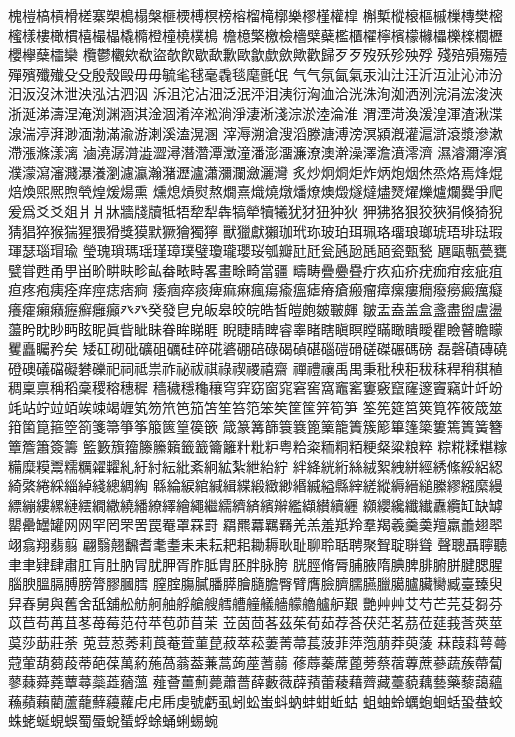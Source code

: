 槐榿槁槓榾槎寨槊槝榻槃榧樮榑榠榜榕榴槞槨樂樛槿權槹
槲槧樅榱樞槭樔槫樊樒櫁樣樓橄樌橲樶橸橇橢橙橦橈樸樢
檐檍檠檄檢檣檗蘗檻櫃櫂檸檳檬櫞櫑櫟檪櫚櫪櫻欅蘖櫺欒
欖鬱欟欸欷盜欹飮歇歃歉歐歙歔歛歟歡歸⽍歹歿殀殄殃殍
殘殕殞殤殪殫殯殲殱⽎殳殷殼毆⽏毋毓毟毬毫毳毯麾氈氓
⽓气氛氤氣汞汕汢汪沂沍沚沁沛汾汨汳沒沐泄泱泓沽泗泅
泝沮沱沾沺泛泯泙泪洟衍洶洫洽洸洙洵洳洒洌浣涓浤浚浹
浙涎涕濤涅淹渕渊涵淇淦涸淆淬淞淌淨淒淅淺淙淤淕淪淮
渭湮渮渙湲湟渾渣湫渫湶湍渟湃渺湎渤滿渝游溂溪溘滉溷
滓溽溯滄溲滔滕溏溥滂溟潁漑灌滬滸滾漿滲漱滯漲滌漾漓
滷澆潺潸澁澀潯潛濳潭澂潼潘澎澑濂潦澳澣澡澤澹濆澪濟
濕濬濔濘濱濮濛瀉瀋濺瀑瀁瀏濾瀛瀚潴瀝瀘瀟瀰瀾瀲灑灣
炙炒炯烱炬炸炳炮烟烋烝烙焉烽焜焙煥煕熈煦煢煌煖煬熏
燻熄熕熨熬燗熹熾燒燉燔燎燠燬燧燵燼燹燿爍爐爛爨爭爬
爰爲⽘爻爼⽙爿牀牆牋牘牴牾犂犁犇犒犖犢犧犹犲狃狆狄
狎狒狢狠狡狹狷倏猗猊猜猖猝猴猯猩猥猾獎獏默獗獪獨獰
獸獵獻獺珈玳珎玻珀珥珮珞璢琅瑯琥珸琲琺瑕琿瑟瑙瑁瑜
瑩瑰瑣瑪瑶瑾璋璞璧瓊瓏瓔珱瓠瓣瓧瓩瓮瓲瓰瓱瓸瓷甄甃
甅甌甎甍甕甓甞甦甬甼畄畍畊畉畛畆畚畩畤畧畫畭畸當疆
疇畴疊疉疂疔疚疝疥疣痂疳痃疵疽疸疼疱痍痊痒痙痣痞痾
痿痼瘁痰痺痲痳瘋瘍瘉瘟瘧瘠瘡瘢瘤瘴瘰瘻癇癈癆癜癘癡
癢癨癩癪癧癬癰癲⽨癶癸發皀皃皈皋皎皖皓皙皚皰皴皸皹
皺盂盍盖盒盞盡盥盧盪蘯盻眈眇眄眩眤眞眥眦眛眷眸睇睚
睨睫睛睥睿睾睹瞎瞋瞑瞠瞞瞰瞶瞹瞿瞼瞽瞻矇矍矗矚矜矣
矮矼砌砒礦砠礪硅碎硴碆硼碚碌碣碵碪碯磑磆磋磔碾碼磅
磊磬磧磚磽磴礇礒礑礙礬礫祀祠祗祟祚祕祓祺祿禊禝禧齋
禪禮禳禹禺秉秕秧秬秡秣稈稍稘稙稠稟禀稱稻稾稷穃穗穉
穡穢穩龝穰穹穽窈窗窕窘窖窩竈窰窶竅竄窿邃竇竊竍竏竕
竓站竚竝竡竢竦竭竰笂笏笊笆笳笘笙笞笵笨笶筐筺笄筍笋
筌筅筵筥筴筧筰筱筬筮箝箘箟箍箜箚箋箒箏筝箙篋篁篌篏
箴篆篝篩簑簔篦篥籠簀簇簓篳篷簗簍篶簣簧簪簟簷簫簽籌
籃籔籏籀籐籘籟籤籖籥籬籵粃粐粤粭粢粫粡粨粳粲粱粮粹
粽糀糅糂糘糒糜糢鬻糯糲糴糶糺紆紂紜紕紊絅絋紮紲紿紵
絆絳絖絎絲絨絮絏絣經綉絛綏絽綛綺綮綣綵緇綽綫總綢綯
緜綸綟綰緘緝緤緞緻緲緡縅縊縣縡縒縱縟縉縋縢繆繦縻縵
縹繃縷縲縺繧繝繖繞繙繚繹繪繩繼繻纃緕繽辮繿纈纉續纒
纐纓纔纖纎纛纜缸缺罅罌罍罎罐⽹网罕罔罘罟罠罨罩罧罸
羂羆羃羈羇羌羔羞羝羚羣羯羲羹羮羶羸譱翅翆翊翕翔翡翦
翩翳翹飜耆耄耋⽾耒耘耙耜耡耨耿耻聊聆聒聘聚聟聢聨聳
聲聰聶聹聽⾀聿肄肆肅肛肓肚肭冐肬胛胥胙胝胄胚胖脉胯
胱脛脩脣脯腋隋腆脾腓腑胼腱腮腥腦腴膃膈膊膀膂膠膕膤
膣腟膓膩膰膵膾膸膽臀臂膺臉臍臑臙臘臈臚臟臠臧臺臻臾
舁舂舅與舊舍舐舖舩舫舸舳艀艙艘艝艚艟艤艢艨艪艫舮艱
艷⾋艸艾芍芒芫芟芻芬苡苣苟苒苴苳苺莓范苻苹苞茆苜茉
苙茵茴茖茲茱荀茹荐荅茯茫茗茘莅莚莪莟莢莖茣莎莇莊荼
莵荳荵莠莉莨菴萓菫菎菽萃菘萋菁菷萇菠菲萍萢萠莽萸蔆
菻葭萪萼蕚蒄葷葫蒭葮蒂葩葆萬葯葹萵蓊葢蒹蒿蒟蓙蓍蒻
蓚蓐蓁蓆蓖蒡蔡蓿蓴蔗蔘蔬蔟蔕蔔蓼蕀蕣蕘蕈蕁蘂蕋蕕薀
薤薈薑薊薨蕭薔薛藪薇薜蕷蕾薐藉薺藏薹藐藕藝藥藜藹蘊
蘓蘋藾藺蘆蘢蘚蘰蘿⾌虍乕虔號虧虱蚓蚣蚩蚪蚋蚌蚶蚯蛄
蛆蚰蛉蠣蚫蛔蛞蛩蛬蛟蛛蛯蜒蜆蜈蜀蜃蛻蜑蜉蜍蛹蜊蜴蜿

